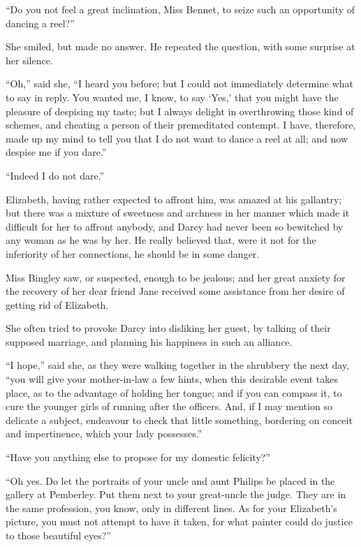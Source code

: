 ``Do you not feel a great inclination, Miss Bennet, to seize such an opportunity of dancing a reel?''

She smiled, but made no answer. He repeated the question, with some surprise at her silence.

``Oh,'' said she, ``I heard you before; but I could not immediately determine what to say in reply. You wanted me, I know, to say `Yes,' that you might have the pleasure of despising my taste; but I always delight in overthrowing those kind of schemes, and cheating a person of their premeditated contempt. I have, therefore, made up my mind to tell you that I do not want to dance a reel at all; and now despise me if you dare.''

``Indeed I do not dare.''

Elizabeth, having rather expected to affront him, was amazed at his gallantry; but there was a mixture of sweetness and archness in her manner which made it difficult for her to affront anybody, and Darcy had never been so bewitched by any woman as he was by her. He really believed that, were it not for the inferiority of her connections, he should be in some danger.

Miss Bingley saw, or suspected, enough to be jealous; and her great anxiety for the recovery of her dear friend Jane received some assistance from her desire of getting rid of Elizabeth.

She often tried to provoke Darcy into disliking her guest, by talking of their supposed marriage, and planning his happiness in such an alliance.

``I hope,'' said she, as they were walking together in the shrubbery the next day, ``you will give your mother-in-law a few hints, when this desirable event takes place, as to the advantage of holding her tongue; and if you can compass it, to cure the younger girls of running after the officers. And, if I may mention so delicate a subject, endeavour to check that little something, bordering on conceit and impertinence, which your lady possesses.''



``Have you anything else to propose for my domestic felicity?''

``Oh yes. Do let the portraits of your uncle and aunt Philips be placed in the gallery at Pemberley. Put them next to your great-uncle the judge. They are in the same profession, you know, only in different lines. As for your Elizabeth's picture, you must not attempt to have it taken, for what painter could do justice to those beautiful eyes?''


